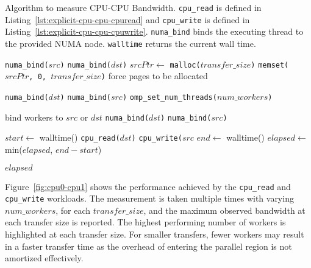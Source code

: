 \begin{algorithm}
    \caption[test]{
        Algorithm to measure CPU-CPU Bandwidth.
        \texttt{cpu\_read} is defined in Listing~\ref{lst:explicit-cpu-cpu-cpuread} and \texttt{cpu\_write} is defined in Listing~\ref{lst:explicit-cpu-cpu-cpuwrite}.
        \texttt{numa\_bind} binds the executing thread to the provided NUMA node.
        \texttt{walltime} returns the current wall time.
    }
    \label{alg:explicit-cpu-cpu}
    \begin{algorithmic}[1]
    \Statex
            \State \texttt{numa\_bind($src$)}
        \Else
            \State \texttt{numa\_bind($dst$)}
        \EndIf
        \State $srcPtr \gets$ \texttt{malloc($transfer\_size$)}
        \State \texttt{memset($srcPtr$, 0, $transfer\_size$)} \Comment force pages to be allocated

            \State \texttt{numa\_bind($dst$)}
        \Else
            \State \texttt{numa\_bind($src$)}
        \EndIf
        \State \texttt{omp\_set\_num\_threads($num\_workers$)}
        \Statex
        
         \Comment bind workers to $src$ or $dst$
                \State \texttt{numa\_bind($dst$)}
            \Else
                \State \texttt{numa\_bind($src$)}
            \EndIf
        \EndFor

        \State $start \gets$ walltime()
            \State \texttt{cpu\_read($dst$)}
        \Else
            \State \texttt{cpu\_write($src$}
        \EndIf
        \State $end \gets$ walltime()
        \State $elapsed \gets$ min($elapsed$, $end-start$)

        \State \Return $elapsed$
    \EndFunction

    \end{algorithmic}
\end{algorithm}


Figure~\ref{fig:cpu0-cpu1} shows the performance achieved by the \texttt{cpu\_read} and \texttt{cpu\_write} workloads.
The measurement is taken multiple times with varying $num\_workers$, for each $transfer\_size$, and the maximum observed bandwidth
at each transfer size is reported.
The highest performing number of workers is highlighted at each transfer size.
For smaller transfers, fewer workers may result in a faster transfer time as the overhead of entering the parallel region is not amortized effectively.

